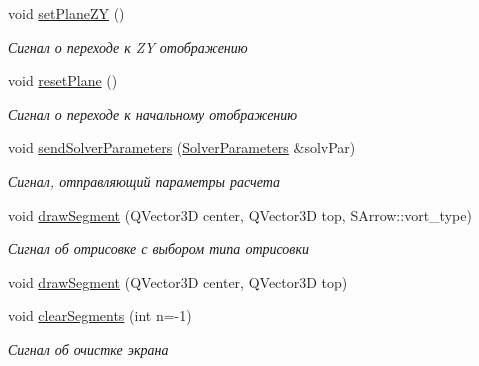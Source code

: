 \begin{DoxyCompactItemize}
\mbox{\label{class_main_window_ae7bfcce75d58e0b90b88dab45c74f7e0}} 
void \mbox{\hyperlink{class_main_window_ae7bfcce75d58e0b90b88dab45c74f7e0}{set\+Plane\+ZY}} ()
\begin{DoxyCompactList}\small\item\em Сигнал о переходе к ZY отображению \end{DoxyCompactList}\item 
\mbox{\label{class_main_window_ad8519a784a41df59bda173b990f88abe}} 
void \mbox{\hyperlink{class_main_window_ad8519a784a41df59bda173b990f88abe}{reset\+Plane}} ()
\begin{DoxyCompactList}\small\item\em Сигнал о переходе к начальному отображению \end{DoxyCompactList}\item 
\mbox{\label{class_main_window_a7bbcf8846ab81fd14bff1d224d54480a}} 
void \mbox{\hyperlink{class_main_window_a7bbcf8846ab81fd14bff1d224d54480a}{send\+Solver\+Parameters}} (\mbox{\hyperlink{struct_solver_parameters}{Solver\+Parameters}} \&solv\+Par)
\begin{DoxyCompactList}\small\item\em Сигнал, отправляющий параметры расчета \end{DoxyCompactList}\item 
\mbox{\label{class_main_window_a7568ddf4139dda654bf945de107fcffe}} 
void \mbox{\hyperlink{class_main_window_a7568ddf4139dda654bf945de107fcffe}{draw\+Segment}} (Q\+Vector3D center, Q\+Vector3D top, S\+Arrow\+::vort\+\_\+type)
\begin{DoxyCompactList}\small\item\em Сигнал об отрисовке с выбором типа отрисовки \end{DoxyCompactList}\item 
void \mbox{\hyperlink{class_main_window_a177cdb1b7d2ca13356de0829a66a98c3}{draw\+Segment}} (Q\+Vector3D center, Q\+Vector3D top)
\item 
\mbox{\label{class_main_window_ae0ae91bd57312da7f9df05039fd5997e}} 
void \mbox{\hyperlink{class_main_window_ae0ae91bd57312da7f9df05039fd5997e}{clear\+Segments}} (int n=-\/1)
\begin{DoxyCompactList}\small\item\em Сигнал об очистке экрана \end{DoxyCompactList}\item 

\end{DoxyCompactItemize}
